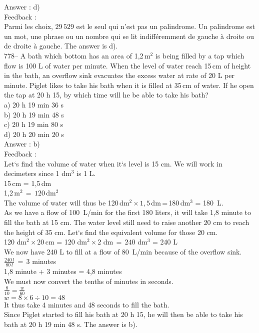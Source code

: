 \documentclass[letterpaper, 12pt]{article}
\begin{document}
Answer : d)\\

Feedback : \\
Parmi les choix, $29\,529$ est le seul qui n'est pas un palindrome.  Un
palindrome est un mot, une phrase ou un nombre qui se lit indiff\'eremment
de gauche \`a droite ou de droite \`a gauche.  The answer is d).\\

778-- A bath which bottom has an area of 1,2\,m$^{2}$ is being filled by a tap which flow is 100 L of water per minute. When the level of water reach  15\,cm of height in the bath, an overflow sink evacuates the excess water at rate of 20 L per minute. Piglet likes to take his bath when it is filled at 35\,cm of water. If he open the tap at 20 h 15, by which time will he be able to take his bath?\\
a) 20 h 19 min 36 s\\
b) 20 h 19 min 48 s\\
c) 20 h 19 min 80 s\\
d) 20 h 20 min 20 s\\


Answer : b)\\

Feedback : \\
Let`s find the volume of water when it`s level is 15 cm. We will work in decimeters since 1 dm$^{3}$ is 1 L.\\
15\,cm = 1,5\,dm\\
1,2\,m$^{2}\,=\,120$\,dm$^{2}$\\
The volume of water will thus be 120\,dm$^{2}\times1,5$\,dm\,=\,180\,dm$^{3}$ = 180~L.\\

As we have a flow of 100~L/min for the first 180 liters, it will take 1,8 minute to fill the bath at 15 cm. The water level still need to raise another 20 cm to reach the height of 35 cm. Let`s find the equivalent volume for those 20 cm.\\

120 dm$^{2}\times 20$\,cm = 120 dm$^{2}\times 2$ dm$\,=\,240$ dm$^{3}$ = 240
L\\[2mm]
We now have 240 L to fill at a flow of 80~L/min because of the overflow sink.\\[2mm]
$\frac{240\,l}{80\,l}\,=\,3$ minutes\\[2mm]
1,8 minute + 3 minutes = 4,8 minutes\\[2mm]
We must now convert the tenths of minutes in seconds.\\[2mm]
$\frac{8}{10}=\frac{w}{60}$\\[2mm]
$w=8\times6\div10=48$\\[2mm]
It thus take 4 minutes and  48 seconds to fill the bath.\\[2mm]
Since Piglet started to fill his bath at 20 h 15, he will then be able to take his bath at 20 h 19 min 48 s.  The answer is b).\\
\end{document}
